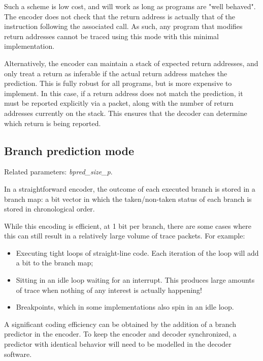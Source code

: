 Such a scheme is low cost, and will work as long as programs are "well behaved".  The encoder does not check that the
return address is actually that of the instruction following the associated call.  As such, any program that
modifies return addresses cannot be traced using this mode with this minimal implementation.

Alternatively, the encoder can maintain a stack of expected return addresses, and only treat a
return as inferable if the actual return address matches the prediction.  This is fully robust for all
programs, but is more expensive to implement.  In this case, if a return address does not match the prediction, 
it must be reported explicitly via a packet, along with the number of return addresses
currently on the stack.  This ensures that the decoder can determine which return is being reported. 

\subsection{Branch prediction mode} \label{sec:branch-prediction}

Related parameters: \textit{bpred\_size\_p}.

In a straightforward encoder, the outcome of each executed branch is stored in
a branch map: a bit vector in which the taken/non-taken status of each branch is stored in
chronological order.

While this encoding is efficient, at 1 bit per branch, there are some cases where this
can still result in a relatively large volume of trace packets.  For example:

\begin{itemize}
  \item Executing tight loops of straight-line code.  Each iteration of the loop will add a bit to the branch map;
  \item Sitting in an idle loop waiting for an interrupt.  This produces large amounts of trace when nothing of 
  any interest is actually happening!  
  \item Breakpoints, which in some implementations also spin in an idle loop.
\end{itemize}

A significant coding efficiency can be obtained by the addition of a branch predictor in the encoder. To keep
the encoder and decoder synchronized, a predictor with identical behavior will need to be modelled in the decoder
software.

